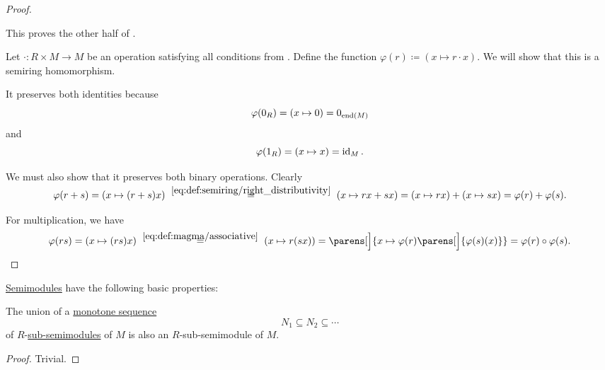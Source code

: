 \begin{proof}
\begin{itemize}
    This proves the other half of .
  \end{itemize}

   Let \( \cdot: R \times M \to M \) be an operation satisfying all conditions from . Define the function \( \varphi(r) \coloneqq (x \mapsto r \cdot x) \). We will show that this is a semiring homomorphism.

  It preserves both identities because
  \begin{equation*}
    \varphi(0_R) = (x \mapsto 0) = 0_{\operatorname{end}(M)}
  \end{equation*}
  and
  \begin{equation*}
    \varphi(1_R) = (x \mapsto x) = \operatorname{id}_M.
  \end{equation*}

  We must also show that it preserves both binary operations. Clearly
  \begin{equation*}
    \varphi(r + s)
    =
    (x \mapsto (r + s) x)
    \reloset {\eqref{eq:def:semiring/right_distributivity}} =
    (x \mapsto r x + s x)
    =
    (x \mapsto r x) + (x \mapsto s x)
    =
    \varphi(r) + \varphi(s).
  \end{equation*}

  For multiplication, we have
  \begin{equation*}
    \varphi(rs)
    =
    (x \mapsto (rs)x)
    \reloset {\eqref{eq:def:magma/associative}} =
    (x \mapsto r(sx))
    =
    \parens[\Big]{ x \mapsto \varphi(r)\parens[\Big]{ \varphi(s)(x) } }
    =
    \varphi(r) \bincirc \varphi(s).
  \end{equation*}
\end{proof}

\begin{proposition}\label{thm:def:semimodule/properties}
  \hyperref[def:semimodule]{Semimodules} have the following basic properties:
  \begin{thmenum}
     The union of a \hyperref[eq:def:partially_ordered_set/homomorphism/sequence]{monotone sequence}
    \begin{equation*}
      N_1 \subseteq N_2 \subseteq \cdots
    \end{equation*}
    of \( R \)-\hyperref[def:semimodule/submodel]{sub-semimodules} of \( M \) is also an \( R \)-sub-semimodule of \( M \).
  \end{thmenum}
\end{proposition}
\begin{proof}
   Trivial.
\end{proof}

